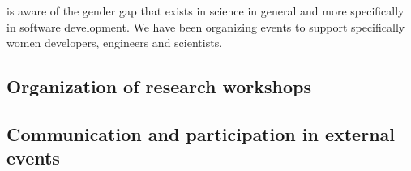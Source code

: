 \documentclass{deliverablereport}
\begin{document}
\ODK is aware of the gender gap that exists in science in general
and more specifically in software development. We have been organizing
events to support specifically women developers, engineers and scientists.



\subsection{Organization of research workshops}



\subsection{Communication and participation in external events}





\end{document}
